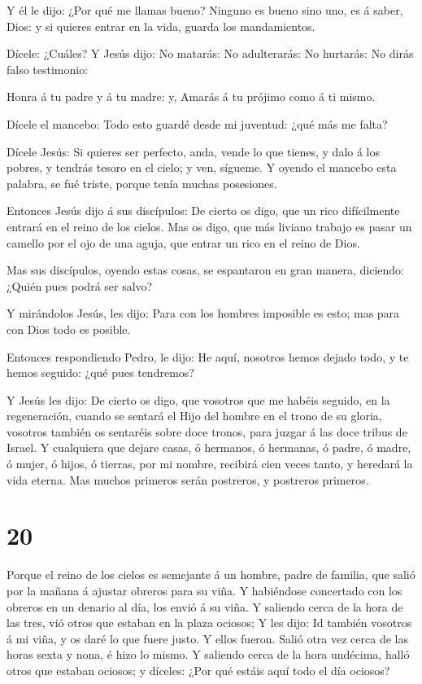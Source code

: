  Y él le dijo: ¿Por qué me llamas bueno? Ninguno es bueno
sino uno, es á saber, Dios: y si quieres entrar en la vida, guarda los
mandamientos.

 Dícele: ¿Cuáles? Y Jesús dijo: No matarás: No adulterarás:
No hurtarás: No dirás falso testimonio:

 Honra á tu padre y á tu madre: y, Amarás á tu prójimo como
á ti mismo.

 Dícele el mancebo: Todo esto guardé desde mi juventud:
¿qué más me falta?

 Dícele Jesús: Si quieres ser perfecto, anda, vende lo que
tienes, y dalo á los pobres, y tendrás tesoro en el cielo; y ven,
sígueme.  Y oyendo el mancebo esta palabra, se fué triste,
porque tenía muchas posesiones.

 Entonces Jesús dijo á sus discípulos: De cierto os digo,
que un rico difícilmente entrará en el reino de los cielos.
 Mas os digo, que más liviano trabajo es pasar un camello
por el ojo de una aguja, que entrar un rico en el reino de Dios.

 Mas sus discípulos, oyendo estas cosas, se espantaron en
gran manera, diciendo: ¿Quién pues podrá ser salvo?

 Y mirándolos Jesús, les dijo: Para con los hombres
imposible es esto; mas para con Dios todo es posible.

 Entonces respondiendo Pedro, le dijo: He aquí, nosotros
hemos dejado todo, y te hemos seguido: ¿qué pues tendremos?

 Y Jesús les dijo: De cierto os digo, que vosotros que me
habéis seguido, en la regeneración, cuando se sentará el Hijo del hombre
en el trono de su gloria, vosotros también os sentaréis sobre doce
tronos, para juzgar á las doce tribus de Israel.  Y
cualquiera que dejare casas, ó hermanos, ó hermanas, ó padre, ó madre, ó
mujer, ó hijos, ó tierras, por mi nombre, recibirá cien veces tanto, y
heredará la vida eterna.  Mas muchos primeros serán
postreros, y postreros primeros.

\hypertarget{section-19}{%
\section{20}\label{section-19}}

 Porque el reino de los cielos es semejante á un hombre,
padre de familia, que salió por la mañana á ajustar obreros para su
viña.  Y habiéndose concertado con los obreros en un denario
al día, los envió á su viña.  Y saliendo cerca de la hora de
las tres, vió otros que estaban en la plaza ociosos;  Y les
dijo: Id también vosotros á mi viña, y os daré lo que fuere justo. Y
ellos fueron.  Salió otra vez cerca de las horas sexta y
nona, é hizo lo mismo.  Y saliendo cerca de la hora
undécima, halló otros que estaban ociosos; y díceles: ¿Por qué estáis
aquí todo el día ociosos?

